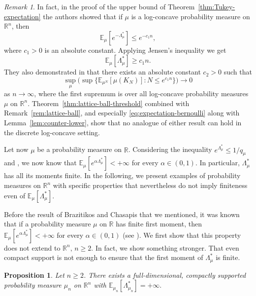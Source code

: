 \documentclass[11pt,a4paper]{article} %
\newtheorem{proposition}[theorem]{Proposition}
\theoremstyle{definition}
\theoremstyle{remark}
\newtheorem{remark}[theorem]{Remark}
\newcommand{\E}{\mathbb{E}}
\newcommand{\1}{\mathds{1}}
\begin{document}
\begin{remark}
    In fact, in the proof of the upper bound of Theorem~\ref{thm:Tukey-expectation} the authors showed that if $\mu$ is a log-concave probability measure on $\mathbb{R}^n$, then $$\E_{\mu}[e^{-\Lambda_{\mu}^\ast}] \leq e^{-c_1n},$$ where $c_1>0$ is an absolute constant. Applying Jensen's inequality we get $$\mathbb{E}_{\mu}[\Lambda_{\mu}^\ast] \geq c_1 n.$$
They also demonstrated in \cite[Corollary 1.5]{BGP2} that there exists an absolute constant $c_2>0$ such that 
 $$\sup_{\mu }\Big(\sup\Big\{{\mathbb E}_{\mu^N}[\mu (K_N)]:N\leq e^{c_1n}\Big\}\Big)\longrightarrow 0$$
 as $n \to \infty$, where the first supremum is over all log-concave probability measures $\mu$ on $\mathbb{R}^n$. Theorem~\ref{thm:lattice-ball-threshold} combined with Remark~\ref{rem:lattice-ball}, and especially \eqref{eq:expectation-bernoulli} along with Lemma~\ref{lem:counter-lower}, show that no analogue of either result can hold in the discrete log-concave setting.
\end{remark}


Let now $\mu$ be a probability measure on $\mathbb{R}$. Considering the inequality $ e^{\Lambda_{\mu}^\ast } \leq 1/q_{\mu}$ and \cite[Proposition 3.2 b)]{BC}, we now know that $\mathbb{E}_{\mu}[e^{\alpha\Lambda_{\mu}^\ast}]<+\infty$ for every $\alpha \in (0,1)$. In particular, $\Lambda_{\mu}^{\ast}$ has all its moments finite. In the following, we present examples of probability measures on $\mathbb{R}^n$ with specific properties that nevertheless do not imply finiteness even of $\mathbb{E}_{\mu}[\Lambda_{\mu}^\ast]$. 

Before the result of Brazitikos and Chasapis that we mentioned, it was known that if a probability measure $\mu$ on $\mathbb{R}$  has finite first moment, then $\mathbb{E}_{\mu}[e^{\alpha\Lambda_{\mu}^\ast}]<+\infty$ for every $\alpha \in (0,1)$ (see \cite[Exercise 1.2.9]{DeuStr}).  We first show that this property does not extend to $\mathbb{R}^n, \, n \geq 2$. In fact, we show something stronger. That even compact support is not enough to ensure that the first moment of $\Lambda_{\mu}^\ast$ is finite.

\begin{proposition}
    Let $n \geq 2$. There exists a full-dimensional, compactly supported probability measure $\mu_n$ on $\mathbb{R}^n$ with $\mathbb{E}_{\mu_n}[\Lambda_{\mu_n}^\ast]=+\infty.$
\end{proposition}
\end{document}
